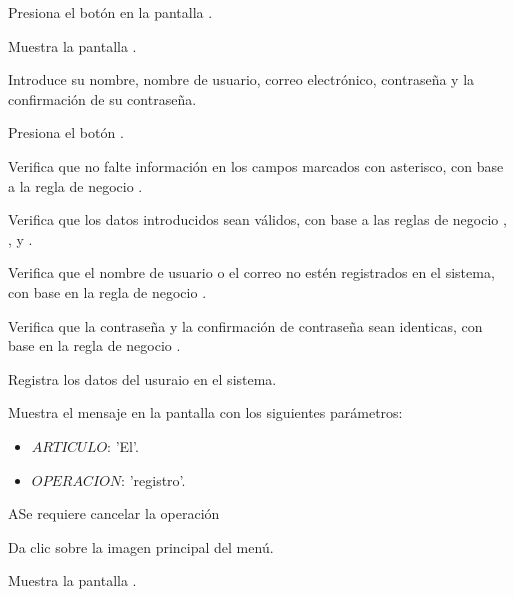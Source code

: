 
\begin{UCtrayectoria}

	\UCpaso [\UCactor] Presiona el botón  en la pantalla .

	\UCpaso Muestra la pantalla .

	\UCpaso [\UCactor] \label{AS-CU1:introducirDatos}Introduce su nombre, nombre de usuario, correo electrónico, contraseña y la confirmación de su contraseña.
	
	\UCpaso [\UCactor] Presiona el botón . 
	
	\UCpaso Verifica que no falte información en los campos marcados con asterisco, con base a la regla de negocio . 

	\UCpaso Verifica que los datos introducidos sean válidos, con base a las reglas de negocio , ,  y . 

	\UCpaso Verifica que el nombre de usuario o el correo no estén registrados en el sistema, con base en la regla de negocio . 
	
	\UCpaso Verifica que la contraseña y la confirmación de contraseña sean identicas, con base en la regla de negocio . 

	\UCpaso Registra los datos del usuraio en el sistema. 

	\UCpaso Muestra el mensaje  en la pantalla  con los siguientes parámetros:
	\begin{itemize}
		\item $ARTICULO$: 'El'.
		\item $OPERACION$: 'registro'.
	\end{itemize}
\end{UCtrayectoria}



\begin{UCtrayectoriaA}{A}{Se requiere cancelar la operación}

	\UCpaso [\UCactor] 	Da clic sobre la imagen principal del menú.

	\UCpaso Muestra la pantalla .
\end{UCtrayectoriaA}
